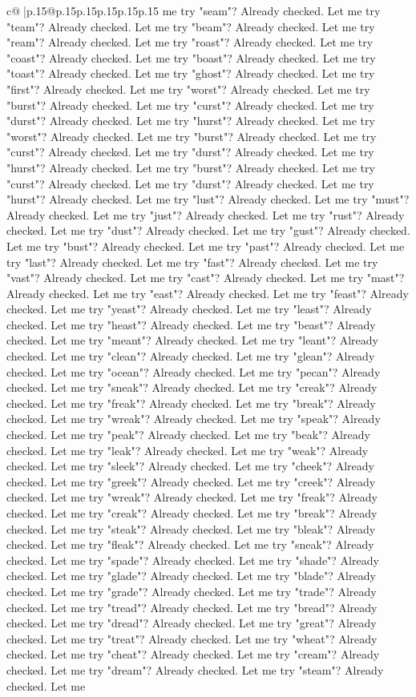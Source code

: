 \documentclass{article}
\begin{document}
{\begin{supertabular}{c@{$\;$}|p{.15\linewidth}@{}p{.15\linewidth}p{.15\linewidth}p{.15\linewidth}p{.15\linewidth}p{.15\linewidth}}
{{{me try "seam"? Already checked. Let me try "team"? Already checked. Let me try "beam"? Already checked. Let me try "ream"? Already checked. Let me try "roast"? Already checked. Let me try "coast"? Already checked. Let me try "boast"? Already checked. Let me try "toast"? Already checked. Let me try "ghost"? Already checked. Let me try "first"? Already checked. Let me try "worst"? Already checked. Let me try "burst"? Already checked. Let me try "curst"? Already checked. Let me try "durst"? Already checked. Let me try "hurst"? Already checked. Let me try "worst"? Already checked. Let me try "burst"? Already checked. Let me try "curst"? Already checked. Let me try "durst"? Already checked. Let me try "hurst"? Already checked. Let me try "burst"? Already checked. Let me try "curst"? Already checked. Let me try "durst"? Already checked. Let me try "hurst"? Already checked. Let me try "lust"? Already checked. Let me try "must"? Already checked. Let me try "just"? Already checked. Let me try "rust"? Already checked. Let me try "dust"? Already checked. Let me try "gust"? Already checked. Let me try "bust"? Already checked. Let me try "past"? Already checked. Let me try "last"? Already checked. Let me try "fast"? Already checked. Let me try "vast"? Already checked. Let me try "cast"? Already checked. Let me try "mast"? Already checked. Let me try "east"? Already checked. Let me try "feast"? Already checked. Let me try "yeast"? Already checked. Let me try "least"? Already checked. Let me try "heast"? Already checked. Let me try "beast"? Already checked. Let me try "meant"? Already checked. Let me try "leant"? Already checked. Let me try "clean"? Already checked. Let me try "glean"? Already checked. Let me try "ocean"? Already checked. Let me try "pecan"? Already checked. Let me try "sneak"? Already checked. Let me try "creak"? Already checked. Let me try "freak"? Already checked. Let me try "break"? Already checked. Let me try "wreak"? Already checked. Let me try "speak"? Already checked. Let me try "peak"? Already checked. Let me try "beak"? Already checked. Let me try "leak"? Already checked. Let me try "weak"? Already checked. Let me try "sleek"? Already checked. Let me try "cheek"? Already checked. Let me try "greek"? Already checked. Let me try "creek"? Already checked. Let me try "wreak"? Already checked. Let me try "freak"? Already checked. Let me try "creak"? Already checked. Let me try "break"? Already checked. Let me try "steak"? Already checked. Let me try "bleak"? Already checked. Let me try "fleak"? Already checked. Let me try "sneak"? Already checked. Let me try "spade"? Already checked. Let me try "shade"? Already checked. Let me try "glade"? Already checked. Let me try "blade"? Already checked. Let me try "grade"? Already checked. Let me try "trade"? Already checked. Let me try "tread"? Already checked. Let me try "bread"? Already checked. Let me try "dread"? Already checked. Let me try "great"? Already checked. Let me try "treat"? Already checked. Let me try "wheat"? Already checked. Let me try "cheat"? Already checked. Let me try "cream"? Already checked. Let me try "dream"? Already checked. Let me try "steam"? Already checked. Let me }}}
\end{supertabular}}
\end{document}
